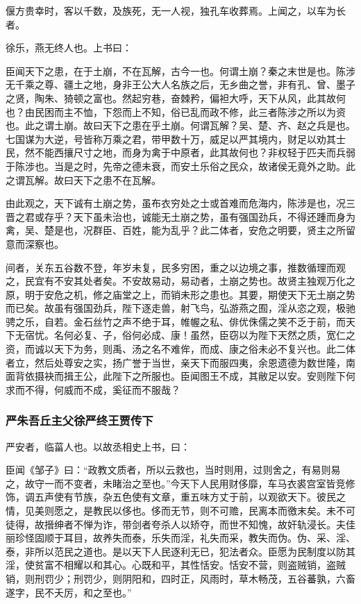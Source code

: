 \documentclass[]{article}
\begin{document}
偃方贵幸时，客以千数，及族死，无一人视，独孔车收葬焉。上闻之，以车为长者。

徐乐，燕无终人也。上书曰：

臣闻天下之患，在于土崩，不在瓦解，古今一也。何谓土崩？秦之末世是也。陈涉无千乘之尊、疆土之地，身非王公大人名族之后，无乡曲之誉，非有孔、曾、墨子之贤，陶朱、猗顿之富也。然起穷巷，奋棘矜，偏袒大呼，天下从风，此其故何也？由民困而主不恤，下怨而上不知，俗已乱而政不修，此三者陈涉之所以为资也。此之谓土崩。故曰天下之患在乎土崩。何谓瓦解？吴、楚、齐、赵之兵是也。七国谋为大逆，号皆称万乘之君，带甲数十万，威足以严其境内，财足以劝其士民，然不能西攘尺寸之地，而身为禽于中原者，此其故何也？非权轻于匹夫而兵弱于陈涉也。当是之时，先帝之德未衰，而安土乐俗之民众，故诸侯无竟外之助。此之谓瓦解。故曰天下之患不在瓦解。

由此观之，天下诚有土崩之势，虽布衣穷处之士或首难而危海内，陈涉是也，况三晋之君或存乎？天下虽未治也，诚能无土崩之势，虽有强国劲兵，不得还踵而身为禽，吴、楚是也，况群臣、百姓，能为乱乎？此二体者，安危之明要，贤主之所留意而深察也。

间者，关东五谷数不登，年岁未复，民多穷困，重之以边境之事，推数循理而观之，民宜有不安其处者矣。不安故易动，易动者，土崩之势也。故贤主独观万化之原，明于安危之机，修之庙堂之上，而销未形之患也。其要，期使天下无土崩之势而已矣。故虽有强国劲兵，陛下逐走兽，射飞鸟，弘游燕之囿，淫从恣之观，极驰骋之乐，自若。金石丝竹之声不绝于耳，帷幄之私、俳优侏儒之笑不乏于前，而天下无宿忧。名何必复、子，俗何必成、康！虽然，臣窃以为陛下天然之质，宽仁之资，而诚以天下为务，则禹、汤之名不难侔，而成、康之俗未必不复兴也。此二体者立，然后处尊安之实，扬广誉于当世，亲天下而服四夷，余恩遗德为数世隆，南面背依摄袂而揖王公，此陛下之所服也。臣闻图王不成，其敝足以安。安则陛下何求而不得，何威而不成，奚征而不服哉？

\hypertarget{header-n4880}{%
\subsubsection{严朱吾丘主父徐严终王贾传下}\label{header-n4880}}

严安者，临菑人也。以故丞相史上书，曰：

臣闻《邹子》曰：``政教文质者，所以云救也，当时则用，过则舍之，有易则易之，故守一而不变者，未睹治之至也。''今天下人民用财侈靡，车马衣裘宫室皆竞修饰，调五声使有节族，杂五色使有文章，重五味方丈于前，以观欲天下。彼民之情，见美则愿之，是教民以侈也。侈而无节，则不可赡，民离本而徼末矣。未不可徒得，故搢绅者不惮为诈，带剑者夸杀人以矫夺，而世不知愧，故奸轨浸长。夫佳丽珍怪固顺于耳目，故养失而泰，乐失而淫，礼失而采，教失而伪。伪、采、淫、泰，非所以范民之道也。是以天下人民逐利无已，犯法者众。臣愿为民制度以防其淫，使贫富不相耀以和其心。心既和平，其性恬安。恬安不营，则盗贼销，盗贼销，则刑罚少；刑罚少，则阴阳和，四时正，风雨时，草木畅茂，五谷蕃孰，六畜遂字，民不夭厉，和之至也。''
\end{document}
